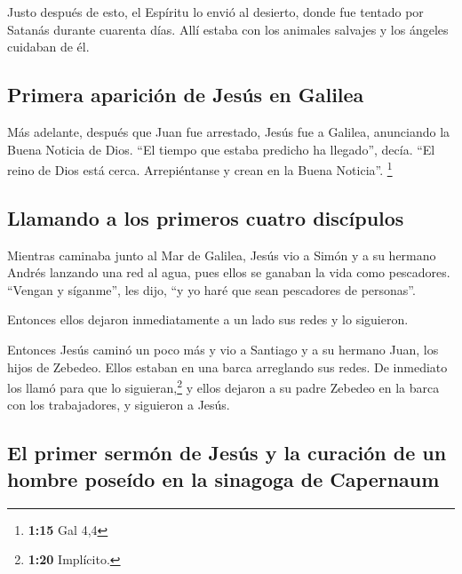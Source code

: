 Justo después de esto, el Espíritu lo envió al desierto,
 donde fue tentado por Satanás durante cuarenta días.
Allí estaba con los animales salvajes y los ángeles cuidaban de él.

\hypertarget{primera-apariciuxf3n-de-jesuxfas-en-galilea}{%
\subsection{Primera aparición de Jesús en
Galilea}\label{primera-apariciuxf3n-de-jesuxfas-en-galilea}}

 Más adelante, después que Juan fue arrestado, Jesús fue
a Galilea, anunciando la Buena Noticia de Dios.  ``El
tiempo que estaba predicho ha llegado'', decía. ``El reino de Dios está
cerca. Arrepiéntanse y crean en la Buena Noticia''. \footnote{\textbf{1:15}
  Gal 4,4}

\hypertarget{llamando-a-los-primeros-cuatro-discuxedpulos}{%
\subsection{Llamando a los primeros cuatro
discípulos}\label{llamando-a-los-primeros-cuatro-discuxedpulos}}

 Mientras caminaba junto al Mar de Galilea, Jesús vio a
Simón y a su hermano Andrés lanzando una red al agua, pues ellos se
ganaban la vida como pescadores.  ``Vengan y síganme'',
les dijo, ``y yo haré que sean pescadores de personas''.

 Entonces ellos dejaron inmediatamente a un lado sus
redes y lo siguieron.

 Entonces Jesús caminó un poco más y vio a Santiago y a
su hermano Juan, los hijos de Zebedeo. Ellos estaban en una barca
arreglando sus redes.  De inmediato los llamó para que lo
siguieran,\footnote{\textbf{1:20} Implícito.} y ellos dejaron a su padre
Zebedeo en la barca con los trabajadores, y siguieron a Jesús.

\hypertarget{el-primer-sermuxf3n-de-jesuxfas-y-la-curaciuxf3n-de-un-hombre-poseuxeddo-en-la-sinagoga-de-capernaum}{%
\subsection{El primer sermón de Jesús y la curación de un hombre poseído
en la sinagoga de
Capernaum}\label{el-primer-sermuxf3n-de-jesuxfas-y-la-curaciuxf3n-de-un-hombre-poseuxeddo-en-la-sinagoga-de-capernaum}}


